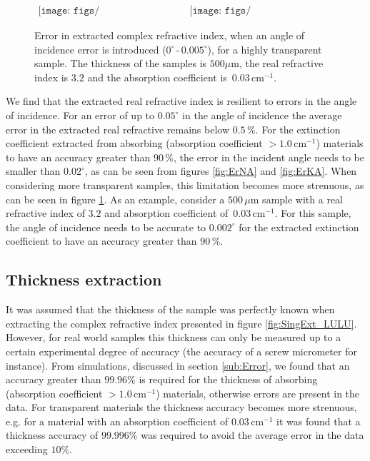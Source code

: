 \begin{figure}[H]
                \begin{center}$
								\begin{array}{cc}
                \texttt{[image: figs/n\_error(32003)Ang-2.png]}&
                \texttt{[image: figs/k\_error(32003)Ang-2.png]}
								\end{array}$
								\end{center}
	\caption[Error in extracted complex refractive index for transparent sample and multiple incident angle errors]{Error in extracted complex refractive index, when an angle of incidence error is introduced ($0^{\circ}\,$-$\,0.005^{\circ}$), for a highly transparent sample. The thickness of the samples is $500\mu$m, the real refractive index is $3.2$ and the absorption coefficient is $\,0.03\,\text{cm}^{-1}$.}
	\label{fig:ErTA}
\end{figure}

We find that the extracted real refractive index is resilient to errors in the angle of incidence. For an error of up to $0.05^{\circ}$ in the angle of incidence the average error in the extracted real refractive remains below $0.5\,\%$. For the extinction coefficient extracted from absorbing (absorption coefficient $>1.0\,\text{cm}^{-1}$) materials to have an accuracy greater than $90\,\%$, the error in the incident angle needs to be smaller than $0.02^{\circ}$, as can be seen from figures \ref{fig:ErNA} and \ref{fig:ErKA}. 
When considering more transparent samples, this limitation becomes more strenuous, as can be seen in figure \ref{fig:ErTA}. As an example, consider a $500\,\mu$m sample with a real refractive index of $3.2$ and absorption coefficient of $\,0.03\,\text{cm}^{-1}$. For this sample, the angle of incidence needs to be accurate to $0.002^{\circ}$ for the extracted extinction coefficient to have an accuracy greater than $90\,\%$.

\subsection{Thickness extraction}
\label{sub: thick}
It was assumed that the thickness of the sample was perfectly known when extracting the complex refractive index presented in figure \ref{fig:SingExt_LULU}. However, for real world samples this thickness can only be measured up to a certain experimental degree of accuracy (the accuracy of a screw micrometer for instance). 
From simulations, discussed in section \ref{sub:Error}, we found that an accuracy greater than $99.96\%$ is required for the thickness of absorbing (absorption coefficient $>1.0\,\text{cm}^{-1}$) materials, otherwise errors are present in the data. For transparent materials the thickness accuracy becomes more strenuous, e.g. for a material with an absorption coefficient of $0.03\,\text{cm}^{-1}$ it was found that a thickness accuracy of $99.996\%$ was required to avoid the average error in the data exceeding $10\%$.
 
